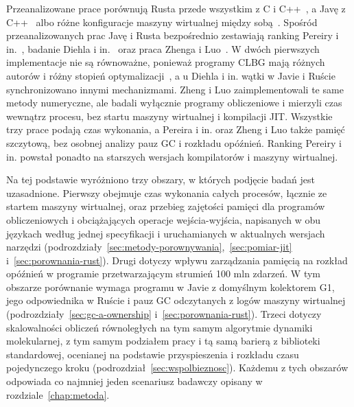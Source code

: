 Przeanalizowane prace porównują Rusta przede wszystkim z C i C++~\cite{zhang2022,li2024,costanzo2021}, a Javę z C++~\cite{lion2022} albo różne konfiguracje maszyny wirtualnej między sobą~\cite{cai2022,zhao2022}.
Spośród przeanalizowanych prac Javę i Rusta bezpośrednio zestawiają ranking Pereiry i in.~\cite{pereira2021}, badanie Diehla i in.~\cite{diehl2024} oraz praca Zhenga i Luo~\cite{zheng2026}.
W dwóch pierwszych implementacje nie są równoważne, ponieważ programy CLBG mają różnych autorów i różny stopień optymalizacji~\cite{vankempen2025}, a u Diehla i in. wątki w Javie i Ruście synchronizowano innymi mechanizmami.
Zheng i Luo zaimplementowali te same metody numeryczne, ale badali wyłącznie programy obliczeniowe i mierzyli czas wewnątrz procesu, bez startu maszyny wirtualnej i kompilacji JIT.
Wszystkie trzy prace podają czas wykonania, a Pereira i in. oraz Zheng i Luo także pamięć szczytową, bez osobnej analizy pauz GC i rozkładu opóźnień.
Ranking Pereiry i in. powstał ponadto na starszych wersjach kompilatorów i maszyny wirtualnej.

Na tej podstawie wyróżniono trzy obszary, w których podjęcie badań jest uzasadnione.
Pierwszy obejmuje czas wykonania całych procesów, łącznie ze startem maszyny wirtualnej, oraz przebieg zajętości pamięci dla programów obliczeniowych i obciążających operacje wejścia-wyjścia, napisanych w obu językach według jednej specyfikacji i uruchamianych w aktualnych wersjach narzędzi (podrozdziały~\ref{sec:metody-porownywania},~\ref{sec:pomiar-jit} i~\ref{sec:porownania-rust}).
Drugi dotyczy wpływu zarządzania pamięcią na rozkład opóźnień w programie przetwarzającym strumień 100 mln zdarzeń.
W tym obszarze porównanie wymaga programu w Javie z domyślnym kolektorem G1, jego odpowiednika w Ruście i pauz GC odczytanych z logów maszyny wirtualnej (podrozdziały~\ref{sec:gc-a-ownership} i~\ref{sec:porownania-rust}).
Trzeci dotyczy skalowalności obliczeń równoległych na tym samym algorytmie dynamiki molekularnej, z tym samym podziałem pracy i tą samą barierą z biblioteki standardowej, ocenianej na podstawie przyspieszenia i rozkładu czasu pojedynczego kroku (podrozdział~\ref{sec:wspolbieznosc}).
Każdemu z tych obszarów odpowiada co najmniej jeden scenariusz badawczy opisany w rozdziale~\ref{chap:metoda}.
